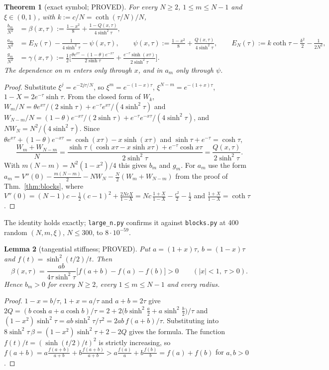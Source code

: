 \documentclass[11pt]{article}
\newtheorem{theorem}{Theorem}
\newtheorem{lemma}[theorem]{Lemma}
\theoremstyle{remark}
\begin{document}
\begin{theorem}[exact symbol; PROVED]\label{thm:symbol}
For every $N\ge2$, $1\le m\le N-1$ and $\xi\in(0,1)$, with $k:=c/N=\coth(\tau/N)/N$,
\begin{align*}
\frac{b_m}{N^2}&=\beta(x,\tau):=\frac{1-x^2}8+\frac{1-Q(x,\tau)}{4\sinh^2\tau},\\
\frac{a_m}{N^2}&=E_N(\tau)-\frac1{4\sinh^2\tau}-\psi(x,\tau),\qquad
\psi(x,\tau):=\frac{1-x^2}8+\frac{Q(x,\tau)}{4\sinh^2\tau},\qquad E_N(\tau):=k\coth\tau-\frac{k^2}2-\frac1{2N^2},\\
\frac{g_m}{N^2}&=\gamma(x,\tau):=\frac12\Big[\frac{\theta e^{x\tau}-(1-\theta)e^{-x\tau}}{2\sinh\tau}
+\frac{e^{-\tau}\sinh(x\tau)}{2\sinh^2\tau}\Big].
\end{align*}
The dependence on $m$ enters only through $x$, and in $a_m$ only through $\psi$.
\end{theorem}
\begin{proof}
Substitute $\xi^j=e^{-2j\tau/N}$, so $\xi^m=e^{-(1-x)\tau}$, $\xi^{N-m}=e^{-(1+x)\tau}$, $1-X=2e^{-\tau}\sinh\tau$. From the
closed form of $W_k$, $W_m/N=\theta e^{x\tau}/(2\sinh\tau)+e^{-\tau}e^{x\tau}/(4\sinh^2\tau)$ and
$W_{N-m}/N=(1-\theta)e^{-x\tau}/(2\sinh\tau)+e^{-\tau}e^{-x\tau}/(4\sinh^2\tau)$, and $NW_N=N^2/(4\sinh^2\tau)$. Since
$\theta e^{x\tau}+(1-\theta)e^{-x\tau}=\cosh(x\tau)-x\sinh(x\tau)$ and $\sinh\tau+e^{-\tau}=\cosh\tau$,
\[
\frac{W_m+W_{N-m}}N=\frac{\sinh\tau\,(\cosh x\tau-x\sinh x\tau)+e^{-\tau}\cosh x\tau}{2\sinh^2\tau}=\frac{Q(x,\tau)}{2\sinh^2\tau}.
\]
With $m(N-m)=N^2(1-x^2)/4$ this gives $b_m$ and $g_m$. For $a_m$ use the form
$a_m=V''(0)-\frac{m(N-m)}2-NW_N-\frac N2(W_m+W_{N-m})$ from the proof of Thm.~\ref{thm:blocks}, where
$V''(0)=(N-1)c-\frac12(c-1)^2+\frac{2NcX}{1-X}=Nc\,\frac{1+X}{1-X}-\frac{c^2}2-\frac12$ and $\frac{1+X}{1-X}=\coth\tau$.
\end{proof}
The identity holds exactly; \texttt{large\_n.py} confirms it against \texttt{blocks.py} at 400 random $(N,m,\xi)$, $N\le300$, to
$8\cdot10^{-59}$.

\begin{lemma}[tangential stiffness; PROVED]\label{lem:bpos}
Put $a=(1+x)\tau$, $b=(1-x)\tau$ and $f(t)=\sinh^2(t/2)/t$. Then
\[
\beta(x,\tau)=\frac{ab}{4\tau\sinh^2\tau}\big[f(a+b)-f(a)-f(b)\big]>0\qquad(|x|<1,\ \tau>0).
\]
Hence $b_m>0$ for every $N\ge2$, every $1\le m\le N-1$ and every radius.
\end{lemma}
\begin{proof}
$1-x=b/\tau$, $1+x=a/\tau$ and $a+b=2\tau$ give $2Q=(b\cosh a+a\cosh b)/\tau=2+2\big(b\sinh^2\frac a2+a\sinh^2\frac b2\big)/\tau$ and
$(1-x^2)\sinh^2\tau=ab\sinh^2\tau/\tau^2=2ab\,f(a+b)/\tau$. Substituting into $8\sinh^2\tau\,\beta=(1-x^2)\sinh^2\tau+2-2Q$ gives the
formula. The function $f(t)/t=(\sinh(t/2)/t)^2$ is strictly increasing, so
$f(a+b)=a\frac{f(a+b)}{a+b}+b\frac{f(a+b)}{a+b}>a\frac{f(a)}a+b\frac{f(b)}b=f(a)+f(b)$ for $a,b>0$.
\end{proof}
\end{document}
